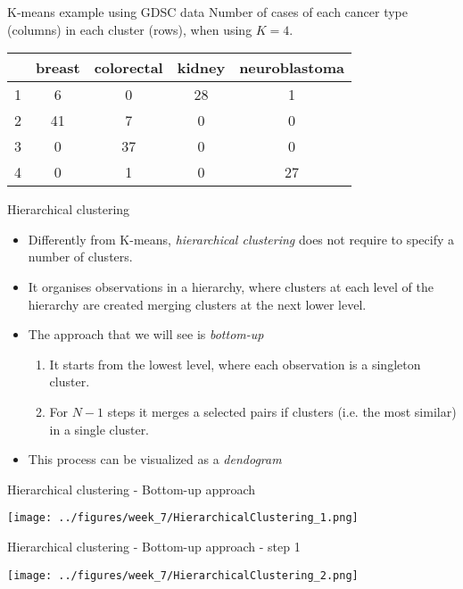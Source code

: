 \documentclass[notes]{beamer}          %
\begin{document}
\begin{frame}{K-means example using GDSC data}
Number of cases of each cancer type (columns) in each cluster (rows), when using $K=4$.
\begin{center}
\begin{tabular}{ c | | c | c | c | c }
& breast & colorectal & kidney & neuroblastoma \\
\hline \hline
1 & 6 & 0 & 28 & 1 \\ 
2 & 41 & 7 & 0 & 0\\
3 & 0 & 37 & 0 & 0\\
4 & 0 & 1 & 0 & 27\\
\end{tabular}
\end{center}
\end{frame}



\begin{frame}{Hierarchical clustering}
\begin{itemize}
\item Differently from K-means, \textit{hierarchical clustering} does not require to specify a number of clusters.
\item It organises observations in a hierarchy, where clusters at each level of the hierarchy are created merging clusters at the next lower level.
\item The approach that we will see is \textit{bottom-up}
\begin{enumerate}
 \item It starts from the lowest level, where each observation is a singleton cluster.
 \item For $N-1$ steps it merges a selected pairs if clusters (i.e. the most similar) in a single cluster.
\end{enumerate}
\item This process can be visualized as a \textit{dendogram}
\end{itemize}
\end{frame}


\begin{frame}{Hierarchical clustering - Bottom-up approach }
\begin{center}
\texttt{[image: ../figures/week\_7/HierarchicalClustering\_1.png]}  
\end{center}
\end{frame}

\begin{frame}{Hierarchical clustering - Bottom-up approach - step 1}
\begin{center}
\texttt{[image: ../figures/week\_7/HierarchicalClustering\_2.png]}  
\end{center}
\end{frame}
\end{document}
